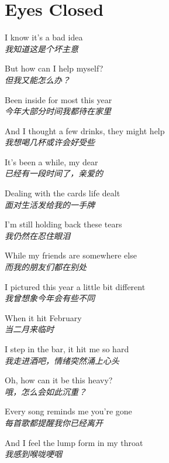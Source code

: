 \section{Eyes Closed}

\thispagestyle{empty}


\begin{spacing}{1.5}
\begin{flushleft}
I know it's a bad idea\\
\textit{我知道这是个坏主意}\lyricspace

But how can I help myself?\\
\textit{但我又能怎么办？}\lyricspace

Been inside for most this year\\
\textit{今年大部分时间我都待在家里}\lyricspace

And I thought a few drinks, they might help\\
\textit{我想喝几杯或许会好受些}\lyricspace

It's been a while, my dear\\
\textit{已经有一段时间了，亲爱的}\lyricspace

Dealing with the cards life dealt\\
\textit{面对生活发给我的一手牌}\lyricspace

I'm still holding back these tears\\
\textit{我仍然在忍住眼泪}\lyricspace

While my friends are somewhere else\\
\textit{而我的朋友们都在别处}\lyricspace

I pictured this year a little bit different\\
\textit{我曾想象今年会有些不同}\lyricspace

When it hit February\\
\textit{当二月来临时}\lyricspace

I step in the bar, it hit me so hard\\
\textit{我走进酒吧，情绪突然涌上心头}\lyricspace

Oh, how can it be this heavy?\\
\textit{哦，怎么会如此沉重？}\lyricspace

Every song reminds me you're gone\\
\textit{每首歌都提醒我你已经离开}\lyricspace

And I feel the lump form in my throat\\
\textit{我感到喉咙哽咽}\lyricspace


\end{flushleft}
\end{spacing}
